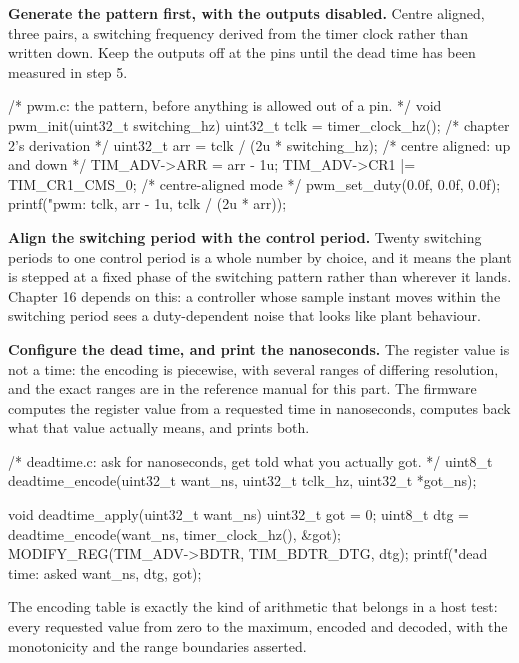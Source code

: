 \begin{steps}
\item \textbf{Generate the pattern first, with the outputs disabled.} Centre
aligned, three pairs, a switching frequency derived from the timer clock rather
than written down. Keep the outputs off at the pins until the dead time has been
measured in step 5.
\begin{ccode}
/* pwm.c: the pattern, before anything is allowed out of a pin. */
void pwm_init(uint32_t switching_hz)
{
    uint32_t tclk = timer_clock_hz();              /* chapter 2's derivation */
    uint32_t arr  = tclk / (2u * switching_hz);    /* centre aligned: up and down */
    TIM_ADV->ARR = arr - 1u;
    TIM_ADV->CR1 |= TIM_CR1_CMS_0;                 /* centre-aligned mode */
    pwm_set_duty(0.0f, 0.0f, 0.0f);
    printf("pwm: %
           tclk, arr - 1u, tclk / (2u * arr));
}
\end{ccode}

\item \textbf{Align the switching period with the control period.} Twenty
switching periods to one control period is a whole number by choice, and it
means the plant is stepped at a fixed phase of the switching pattern rather than
wherever it lands. Chapter 16 depends on this: a controller whose sample instant
moves within the switching period sees a duty-dependent noise that looks like
plant behaviour.

\item \textbf{Configure the dead time, and print the nanoseconds.} The register
value is not a time: the encoding is piecewise, with several ranges of differing
resolution, and the exact ranges are in the reference manual for this part. The
firmware computes the register value from a requested time in nanoseconds,
computes back what that value actually means, and prints both.
\begin{ccode}
/* deadtime.c: ask for nanoseconds, get told what you actually got. */
uint8_t deadtime_encode(uint32_t want_ns, uint32_t tclk_hz, uint32_t *got_ns);

void deadtime_apply(uint32_t want_ns)
{
    uint32_t got = 0;
    uint8_t dtg = deadtime_encode(want_ns, timer_clock_hz(), &got);
    MODIFY_REG(TIM_ADV->BDTR, TIM_BDTR_DTG, dtg);
    printf("dead time: asked %
           want_ns, dtg, got);
}
\end{ccode}
The encoding table is exactly the kind of arithmetic that belongs in a host
test: every requested value from zero to the maximum, encoded and decoded, with
the monotonicity and the range boundaries asserted.


\end{steps}

